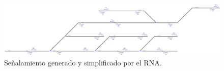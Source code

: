 \lipsum[1]

 \begin{figure}[H]
	\centering
	\includegraphics[width=1\textwidth]{resultados-obtenidos/ejemplo6/images/6_RNA.png}
	\centering\caption{Señalamiento generado y simplificado por el RNA.}
\end{figure}

\lipsum[1]